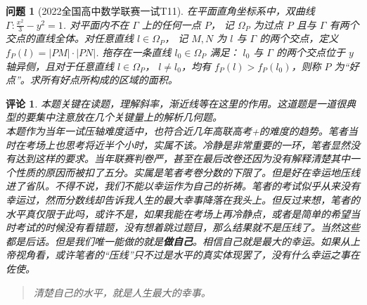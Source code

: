 \documentclass[UTF8,oneside,11pt]{book}
\theoremstyle{plain}\newtheorem{thm}{定理}[chapter]
\theoremstyle{definition}\newtheorem{definition}[thm]{定义}
\theoremstyle{plain}\newtheorem{axiom}[thm]{公理}
\theoremstyle{plain}\newtheorem{coro}[thm]{推论}
\theoremstyle{plain}\newtheorem{lemma}[thm]{引理}
\theoremstyle{plain}\newtheorem{prop}[thm]{性质}
\theoremstyle{plain}\newtheorem{conj}[thm]{猜想}
\theoremstyle{plain}\newtheorem{ques}[thm]{问题}
\theoremstyle{plain}\newtheorem{const}[thm]{构造}
\theoremstyle{remark}\newtheorem{notation}[thm]{注记}
\theoremstyle{plain}\newtheorem*{app}{应用}
\theoremstyle{plain}\newtheorem*{exam}{测试}
\theoremstyle{plain}\newtheorem*{exer}{例子}
\theoremstyle{plain}\newtheorem*{remark}{评论}
\theoremstyle{remark}\newtheorem*{note}{\small{注}}
\numberwithin{equation}{section}
\numberwithin{thm}{chapter}
\begin{document}
\begin{ques}[2022全国高中数学联赛一试T11]
    在平面直角坐标系中，双曲线 $ \Gamma:\frac{x^2}{3}-y^2=1  $. 对平面内不在 $ \Gamma  $ 上的任何一点 $ P  $， 记 $ \Omega_P  $ 为过点 $ P  $ 且与 $ \Gamma  $ 有两个交点的直线全体。对任意直线 $ l\in \Omega_P  $， 记  $ M,N  $ 为 $ l  $ 与 $ \Gamma  $ 的两个交点，定义 $ f_P(l)=|PM|\cdot|PN| $. 拖存在一条直线 $ l_0\in \Omega_P  $ 满足： $ l_0  $ 与 $ \Gamma  $ 的两个交点位于 $ y  $ 轴异侧，且对于任意直线 $ l\in\Omega_P  $， $ l\not=l_0 $，均有 $ f_P(l)>f_P(l_0) $，则称 $ P  $ 为“好点”。求所有好点所构成的区域的面积。  
\end{ques}
\begin{remark}
    本题关键在读题，理解斜率，渐近线等在这里的作用。这道题是一道很典型的要集中注意放在几个关键量上的解析几何题。\\
    本题作为当年一试压轴难度适中，也符合近几年高联高考+的难度的趋势。笔者当时在考场上也思考将近半个小时，实属不该。冷静是非常重要的一环，笔者显然没有达到这样的要求。当年联赛判卷严，甚至在最后改卷还因为没有解释清楚其中一个性质的原因而被扣了五分。实属是笔者考卷分数的下限了。但是好在幸运地压线进了省队。不得不说，我们不能以幸运作为自己的祈祷。笔者的考试似乎从来没有幸运过，然而分数线却告诉我人生的最大幸事降落在我头上。但反过来想，笔者的水平真仅限于此吗，或许不是，如果我能在考场上再冷静点，或者是简单的希望当时考试的时候没有看错题，没有想着跳过题目，那么结果就不是压线了。当然这些都是后话。但是我们唯一能做的就是\textbf{做自己}。相信自己就是最大的幸运。如果从上帝视角看，或许笔者的“压线”只不过是水平的真实体现罢了，没有什么幸运之事在佐使。
        \begin{quote}
            清楚自己的水平，就是人生最大的幸事。
        \end{quote}
\end{remark}
\end{document}
